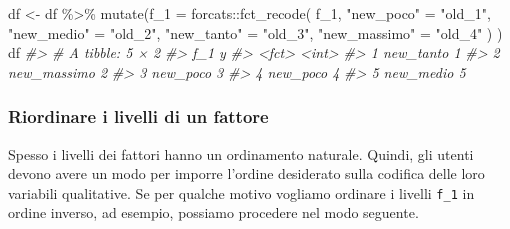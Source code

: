 \documentclass[
  10pt,
  italian,
  a4paper,
  extrafontsizes,onecolumn,openright
  ]{memoir}
\newenvironment{Shaded}{\begin{snugshade}}{\end{snugshade}}
\newcommand{\AttributeTok}[1]{\textcolor[rgb]{0.77,0.63,0.00}{#1}}
\newcommand{\CommentTok}[1]{\textcolor[rgb]{0.56,0.35,0.01}{\textit{#1}}}
\newcommand{\FunctionTok}[1]{\textcolor[rgb]{0.00,0.00,0.00}{#1}}
\newcommand{\NormalTok}[1]{#1}
\newcommand{\OtherTok}[1]{\textcolor[rgb]{0.56,0.35,0.01}{#1}}
\newcommand{\SpecialCharTok}[1]{\textcolor[rgb]{0.00,0.00,0.00}{#1}}
\newcommand{\StringTok}[1]{\textcolor[rgb]{0.31,0.60,0.02}{#1}}
\begin{document}
\begin{Shaded}
\begin{Highlighting}[]
\NormalTok{df }\OtherTok{\textless{}{-}}\NormalTok{ df }\SpecialCharTok{\%\textgreater{}\%}
  \FunctionTok{mutate}\NormalTok{(}\AttributeTok{f\_1 =}
\NormalTok{    forcats}\SpecialCharTok{::}\FunctionTok{fct\_recode}\NormalTok{(}
\NormalTok{      f\_1, }
      \StringTok{"new\_poco"} \OtherTok{=} \StringTok{"old\_1"}\NormalTok{, }
      \StringTok{"new\_medio"} \OtherTok{=} \StringTok{"old\_2"}\NormalTok{, }
      \StringTok{"new\_tanto"} \OtherTok{=} \StringTok{"old\_3"}\NormalTok{, }
      \StringTok{"new\_massimo"} \OtherTok{=} \StringTok{"old\_4"}
\NormalTok{      )}
\NormalTok{   )}
\NormalTok{df}
\CommentTok{\#\textgreater{} \# A tibble: 5 × 2}
\CommentTok{\#\textgreater{}   f\_1             y}
\CommentTok{\#\textgreater{}   \textless{}fct\textgreater{}       \textless{}int\textgreater{}}
\CommentTok{\#\textgreater{} 1 new\_tanto       1}
\CommentTok{\#\textgreater{} 2 new\_massimo     2}
\CommentTok{\#\textgreater{} 3 new\_poco        3}
\CommentTok{\#\textgreater{} 4 new\_poco        4}
\CommentTok{\#\textgreater{} 5 new\_medio       5}
\end{Highlighting}
\end{Shaded}

\hypertarget{riordinare-i-livelli-di-un-fattore}{%
\subsubsection{Riordinare i livelli di un fattore}\label{riordinare-i-livelli-di-un-fattore}}

Spesso i livelli dei fattori hanno un ordinamento naturale. Quindi, gli utenti devono avere un modo per imporre l'ordine desiderato sulla codifica delle loro variabili qualitative. Se per qualche motivo vogliamo ordinare i livelli \texttt{f\_1} in ordine inverso, ad esempio, possiamo procedere nel modo seguente.

\begin{Shaded}
\end{Shaded}
\end{document}
